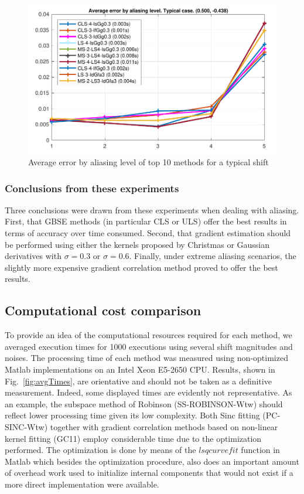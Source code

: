 \begin{figure}[htpb]
\centering
\includegraphics[width=.65\textwidth]{img/tableAliasingTop10ByShift13}
\caption{Average error by aliasing level of top 10 methods for a typical shift}
\label{fig:aliasingTop10ByShiftTypical}
\end{figure}

\subsubsection{Conclusions from these experiments}
\label{sec:aliasingConclusionsChapter1}
Three conclusions were drawn from these experiments when dealing with aliasing. First, that GBSE methods (in particular CLS or ULS) offer the best results in terms of accuracy over time consumed. Second, that gradient estimation should be performed using either the kernels proposed by Christmas \cite{christmas1998spatial} or Gaussian derivatives with $\sigma=0.3$ or $\sigma=0.6$. Finally, under extreme aliasing scenarios, the slightly more expensive gradient correlation method proved to offer the best results.


\subsection{Computational cost comparison}
\label{sec:ComputationalCostChapter1}
To provide an idea of the computational resources required for each method, we averaged execution times for 1000 executions using several shift magnitudes and noises. The processing time of each method was measured using non-optimized Matlab implementations on an Intel Xeon E5-2650 CPU. Results, shown in Fig.~\ref{fig:avgTimes}, are orientative and should not be taken as a definitive measurement. Indeed, some displayed times are evidently not representative. As an example, the subspace method of Robinson (SS-ROBINSON-Wtw) should reflect lower processing time given its low complexity. Both Sinc fitting (PC-SINC-Wtw) together with gradient correlation methods based on non-linear kernel fitting (GC11) employ considerable time due to the optimization performed. The optimization is done by means of the $lsqcurvefit$ function in Matlab which besides the optimization procedure, also does an important amount of overhead work used to initialize internal components that would not exist if a more direct implementation were available.

